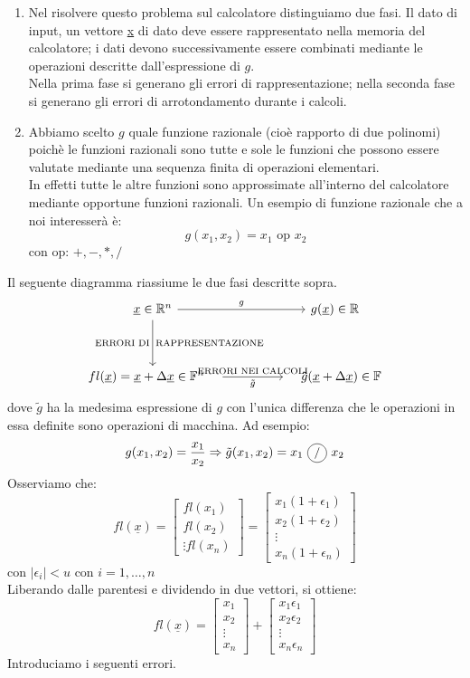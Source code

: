 \documentclass[12pt]{report}
\newcommand{\circled}[1]{%
	\begin{tikzpicture}[baseline=(char.base)]
		\node[shape=circle, draw, inner sep=1.2pt, minimum size=1.5em] (char) {\small #1};
	\end{tikzpicture}%
}
\begin{document}
\begin{enumerate}
	\item Nel risolvere questo problema sul calcolatore distinguiamo due fasi. Il dato di input, un vettore \underline{x} di dato deve essere rappresentato nella memoria del calcolatore; i dati devono successivamente essere combinati mediante le operazioni descritte dall'espressione di $g$. \\
	Nella prima fase si generano gli errori di rappresentazione; nella seconda fase si generano gli errori di arrotondamento durante i calcoli.
	\item Abbiamo scelto $g$ quale funzione razionale (cioè rapporto di due polinomi) poichè le funzioni razionali sono tutte e sole le funzioni che possono essere valutate mediante una sequenza finita di operazioni elementari. \\
	In effetti tutte le altre funzioni sono approssimate all'interno del calcolatore mediante opportune funzioni razionali. Un esempio di funzione razionale che a noi interesserà è:
	\[
	g(x_1, x_2) = x_1 \text{ op } x_2
	\]
	con $\text{op: } +, -, *, /$
\end{enumerate}
Il seguente diagramma riassiume le due fasi descritte sopra.
\[
\begin{tikzcd}[column sep=huge, row sep=huge]
\underline{x} \in \mathbb{R}^n \arrow[r, "g"] \arrow[d, "\text{ERRORI DI}"' , "\text{RAPPRESENTAZIONE}"]
& g(\underline{x}) \in \mathbb{R} \\
fl(\underline{x}) = \underline{x} + \Delta \underline{x} \in \mathbb{F}^n \quad  \arrow[r, "\tilde{g}"', "\text{ERRORI NEI CALCOLI}"]
& \quad \tilde{g}(\underline{x} + \Delta \underline{x}) \in \mathbb{F}
\end{tikzcd}
\]
dove $\tilde{g}$ ha la medesima espressione di $g$ con l'unica differenza che le operazioni in essa definite sono operazioni di macchina.
Ad esempio:
\[
g(x_1, x_2) = \frac{x_1}{x_2} \Rightarrow \tilde{g}(x_1, x_2) = x_1\ \circled{/}\ x_2
\]
Osserviamo che:
\[
fl(\underline{x}) = \begin{bmatrix}fl(x_1) \\ fl(x_2) \\ \vdots fl(x_n)\end{bmatrix} = \begin{bmatrix}x_1(1 + \epsilon_1) \\ x_2(1+\epsilon_2) \\ \vdots \\ x_n(1+\epsilon_n)\end{bmatrix}
\]
con $|\epsilon_i| < u$ con $i = 1, \dots, n$ \\
Liberando dalle parentesi e dividendo in due vettori, si ottiene:
\[
fl(\underline{x}) = \begin{bmatrix}x_1 \\ x_2 \\ \vdots \\ x_n\end{bmatrix} + \begin{bmatrix}x_1\epsilon_1 \\ x_2\epsilon_2 \\ \vdots \\ x_n\epsilon_n\end{bmatrix}
\]
Introduciamo i seguenti errori.
\end{document}
